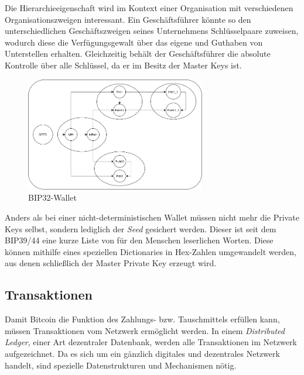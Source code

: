 Die Hierarchieeigenschaft wird im Kontext einer Organisation mit verschiedenen Organisationszweigen interessant. Ein Geschäftsführer könnte so den unterschiedlichen Geschäftszweigen seines Unternehmens Schlüsselpaare zuweisen, wodurch diese die Verfügungsgewalt über das eigene und Guthaben von Unterstellen erhalten. Gleichzeitig behält der Geschäftsführer die absolute Kontrolle über alle Schlüssel, da er im Besitz der Master Keys ist. 
\begin{figure}[htpb]
	\centering
	\includegraphics[width=0.7\textwidth]{images/bip32_wallet.png}
	\caption{BIP32-Wallet}
	\label{6braun:fig:_wallet}
\end{figure}
Anders als bei einer nicht-deterministischen Wallet müssen nicht mehr die Private Keys selbst, sondern lediglich der \emph{Seed} gesichert werden. Dieser ist seit dem BIP39/44 eine kurze Liste von für den Menschen leserlichen Worten. Diese können mithilfe eines speziellen Dictionaries in Hex-Zahlen umgewandelt werden, aus denen schließlich der Master Private Key erzeugt wird.
\subsection{Transaktionen}
Damit Bitcoin die Funktion des Zahlungs- bzw. Tauschmittels erfüllen kann, müssen Transaktionen vom Netzwerk ermöglicht werden. In einem \emph{Distributed Ledger}, einer Art dezentraler Datenbank, werden alle Transaktionen im Netzwerk aufgezeichnet. Da es sich um ein gänzlich digitales und dezentrales Netzwerk handelt, sind spezielle Datenstrukturen und Mechanismen nötig.
